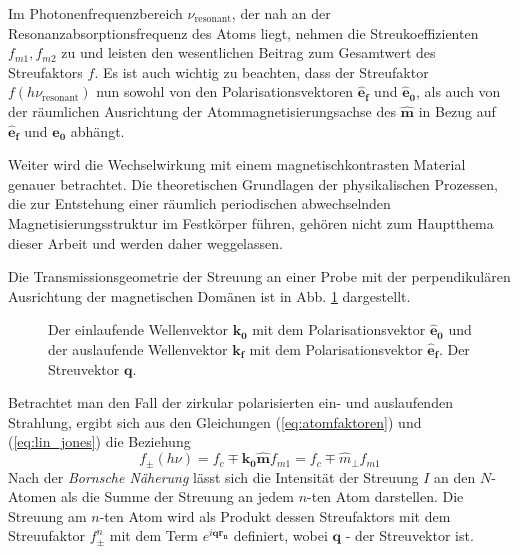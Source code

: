 \noindent
Im Photonenfrequenzbereich $\nu_\text{resonant}$, der nah an der Resonanzabsorptionsfrequenz des Atoms liegt, nehmen die Streukoeffizienten $f_{m1}, f_{m2}$ zu und leisten den wesentlichen Beitrag zum Gesamtwert des Streufaktors $f$. Es ist auch wichtig zu beachten, dass der Streufaktor $f(h\nu_\text{resonant})$ nun sowohl von den Polarisationsvektoren $\mathbf{\hat{e}_f}$ und $\mathbf{\hat{e}_0}$, als auch von der räumlichen Ausrichtung der Atommagnetisierungsachse des  $\mathbf{\hat{m}}$ in Bezug auf $\mathbf{\hat{e}_f}$ und $\mathbf{\hat{e}_0}$ abhängt.


\noindent
Weiter wird die Wechselwirkung mit einem magnetischkontrasten Material genauer betrachtet. Die theoretischen Grundlagen der physikalischen Prozessen, die zur Entstehung einer räumlich periodischen abwechselnden Magnetisierungsstruktur im Festkörper führen, gehören nicht zum Hauptthema dieser Arbeit und werden daher weggelassen.  

\noindent
Die Transmissionsgeometrie der Streuung an einer Probe mit der perpendikulären Ausrichtung der magnetischen Domänen ist in Abb. \ref{fig:transmission_geometrie} dargestellt.
\begin{figure}[ht]
    \centering
    
    \caption{Der einlaufende Wellenvektor $\mathbf{k_0}$ mit dem Polarisationsvektor $\mathbf{\hat{e}_0}$ und der auslaufende Wellenvektor $\mathbf{k_f}$ mit dem Polarisationsvektor $\mathbf{\hat{e}_f}$. Der Streuvektor $\mathbf{q}$.}
    \label{fig:transmission_geometrie}
\end{figure}

\noindent
Betrachtet man den Fall der zirkular polarisierten ein- und auslaufenden Strahlung, ergibt sich aus den Gleichungen (\ref{eq:atomfaktoren}) und (\ref{eq:lin_jones}) die Beziehung
\begin{equation}
    f_{\pm}(h\nu)=f_{c}\mp \mathbf{k_0}\mathbf{\hat{m}} f_{m1} = f_{c}\mp \hat{m}_\perp f_{m1}
    \label{eq:faktor_zirc}
\end{equation}
Nach der \emph{Bornsche Näherung} lässt sich die Intensität der Streuung $I$ an den $N$-Atomen als die Summe der Streuung an jedem $n$-ten Atom darstellen. Die Streuung am $n$-ten Atom wird  als Produkt dessen Streufaktors mit dem Streuufaktor $f_{\pm}^n$ mit dem Term $e^{i\mathbf{qr_n}}$ definiert, wobei $\mathbf{q}$ - der Streuvektor ist.

